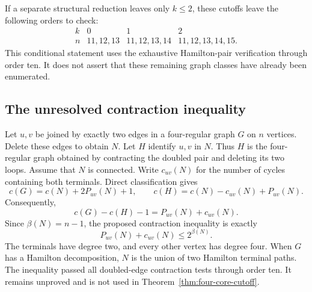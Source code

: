 If a separate structural reduction leaves only $k\le2$, these cutoffs leave the following orders to check:
\[
\begin{array}{c|ccc}
 k&0&1&2\\\hline
 n&11,12,13&11,12,13,14&11,12,13,14,15.
\end{array}
\]
This conditional statement uses the exhaustive Hamilton-pair verification through order ten.
It does not assert that these remaining graph classes have already been enumerated.

\subsection{The unresolved contraction inequality}

Let $u,v$ be joined by exactly two edges in a four-regular graph $G$ on $n$ vertices.
Delete these edges to obtain $N$.
Let $H$ identify $u,v$ in $N$.
Thus $H$ is the four-regular graph obtained by contracting the doubled pair and deleting its two loops.
Assume that $N$ is connected.
Write $c_{uv}(N)$ for the number of cycles containing both terminals.
Direct classification gives
\[
 c(G)=c(N)+2P_{uv}(N)+1,
 \qquad c(H)=c(N)-c_{uv}(N)+P_{uv}(N).
\]
Consequently,
\[
 c(G)-c(H)-1=P_{uv}(N)+c_{uv}(N).
\]
Since $\beta(N)=n-1$, the proposed contraction inequality is exactly
\[
 P_{uv}(N)+c_{uv}(N)\le2^{\beta(N)}.
\]
The terminals have degree two, and every other vertex has degree four.
When $G$ has a Hamilton decomposition, $N$ is the union of two Hamilton terminal paths.
The inequality passed all doubled-edge contraction tests through order ten.
It remains unproved and is not used in Theorem~\ref{thm:four-core-cutoff}.
